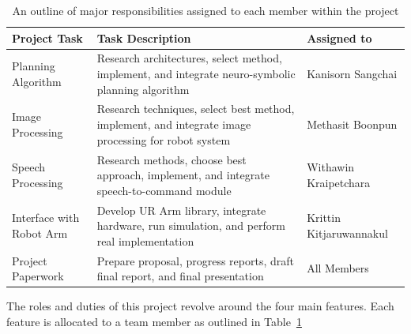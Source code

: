 \documentclass[12pt]{extarticle}
\begin{document}
{
\renewcommand{\arraystretch}{1.3} %
\begin{table}[h!]
    \centering
    \begin{tabular}{|l|p{6cm}|l|}
        \hline
        \textbf{Project Task} & \textbf{Task Description} & \textbf{Assigned to} \\
        \hline
        Planning Algorithm & Research architectures, select method, implement, and integrate neuro-symbolic planning algorithm & Kanisorn Sangchai \\
        \hline
        Image Processing & Research techniques, select best method, implement, and integrate image processing for robot system & Methasit Boonpun \\
        \hline
        Speech Processing & Research methods, choose best approach, implement, and integrate speech-to-command module & Withawin Kraipetchara \\
        \hline
        Interface with Robot Arm & Develop UR Arm library, integrate hardware, run simulation, and perform real implementation & Krittin Kitjaruwannakul \\
        \hline
        Project Paperwork & Prepare proposal, progress reports, draft final report, and final presentation & All Members \\
        \hline
    \end{tabular}
    \caption{An outline of major responsibilities assigned to each member within the project}
    \label{tab:roles_responsibilities}
\end{table}
}

The roles and duties of this project revolve around the four main features. Each feature is allocated to a team member as outlined in Table~\ref{tab:roles_responsibilities}


\newpage


\end{document}
